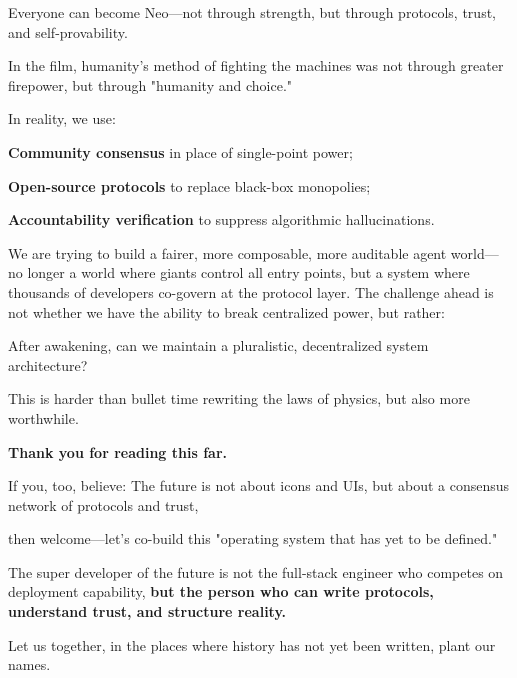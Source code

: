 \vspace{1em}

Everyone can become Neo---not through strength, but through protocols, trust, and self-provability.

In the film, humanity's method of fighting the machines was not through greater firepower, but through "humanity and choice."

In reality, we use:

\textbf{Community consensus} in place of single-point power;

\textbf{Open-source protocols} to replace black-box monopolies;

\textbf{Accountability verification} to suppress algorithmic hallucinations.

We are trying to build a fairer, more composable, more auditable agent world---no longer a world where giants control all entry points, but a system where thousands of developers co-govern at the protocol layer.
The challenge ahead is not whether we have the ability to break centralized power, but rather:

After awakening, can we maintain a pluralistic, decentralized system architecture?

This is harder than bullet time rewriting the laws of physics, but also more worthwhile.

\vspace{1em}

\textbf{Thank you for reading this far.}

If you, too, believe:
The future is not about icons and UIs, but about a consensus network of protocols and trust,

then welcome---let's co-build this "operating system that has yet to be defined."

The super developer of the future is not the full-stack engineer who competes on deployment capability, \textbf{but the person who can write protocols, understand trust, and structure reality.}

Let us together, in the places where history has not yet been written, plant our names.
